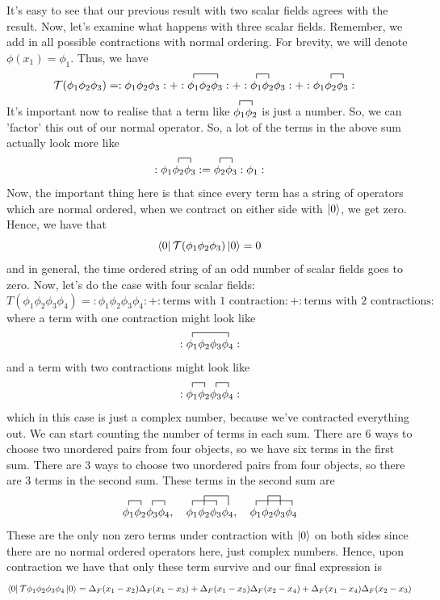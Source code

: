 \documentclass[11pt, oneside]{article}   	%
\theoremstyle{newline}
\theoremstyle{newline}
\theoremstyle{newline}
\theoremstyle{newline}
\theoremstyle{newline}
\begin{document}
It's easy to see that our previous result with two scalar fields agrees with the result. Now, let's examine what happens with three scalar fields. Remember, we add in all possible contractions with normal ordering. For brevity, we will denote $\phi(x_1) = \phi_1$. Thus, we have \begin{align*}  \mathcal{T}( \phi_1 \phi_2 \phi_3 ) &= :\phi_1 \phi_2 \phi_3:
+ :\contraction{}{\phi_1}{\phi_2}{\phi_3} \phi_1 \phi_2 \phi_3: + :\contraction{}{\phi_1}{}{\phi_2} \phi_1 \phi_2 \phi_3: + :\contraction{\phi_1}{\phi_2}{}{\phi_3} \phi_1 \phi_2 \phi_3 :  \end{align*} 
It's important now to realise that a term like $\contraction{}{\phi_1}{}{\phi_2} \phi_1 \phi_2$ is just a number. So, we can 'factor' this out of our normal operator. So, a lot of the terms in the above sum actually look more like \[ :\contraction{\phi_1} {\phi_2 }{}{\phi_3} \phi_1 \phi_2 \phi_3 : = \contraction{}{\phi_2}{}{\phi_3} \phi_2 \phi_3 :\phi_1: \] Now, the important thing here is that since every term has a string of operators which are normal ordered, when we contract on either side with $\ket{0}$, we get zero. Hence, we have that \[ \bra{0}\mathcal{T}(\phi_1 \phi_2 \phi_3)\ket{0} = 0 \] and in general, the time ordered string of an odd number of scalar fields goes to zero.  
Now, let's do the case with four scalar fields: 
\[ T(\phi_1 \phi_2 \phi_3 \phi_4 )  = :\phi_1 \phi_2 \phi_3 \phi_4:  + :\text{terms with 1 contraction}: + : \text{terms with 2 contractions} : \] 
where a term with one contraction might look like \[ :\contraction{}{\phi_1}{\phi_2 \phi_3} {\phi_4} \phi_1 \phi_2 \phi_3 \phi_4 : \] and a term with two contractions might look like\[ :\contraction{}{\phi_1}{}{\phi_2} \phi_1 \phi_2 \contraction{}{\phi_3}{}{\phi_4} \phi_3 \phi_4: \] which in this case is just a complex number, because we've contracted everything out. We can start counting the number of terms in each sum. There are 6 ways to choose two unordered pairs from four objects, so we have six terms in the first sum. There are 3 ways to choose two unordered pairs from four objects, so there are 3 terms in the second sum. 
These terms in the second sum are \[ \contraction{}{\phi_1}{}{\phi_2} \phi_1 \phi_2 \contraction{}{\phi_3}{}{\phi_4}\phi_3\phi_4, \quad \contraction{}{\phi_1}{\phi_2}{\phi_3} \contraction[2ex]{\phi_1}{\phi_2}{\phi_3}{\phi_4} \phi_1\phi_2 \phi_3 \phi_4, \quad \contraction{}{\phi_1}{\phi_2 \phi_3}{\phi_4} \contraction[2ex]{\phi_1}{\phi_2}{}{\phi_3} \phi_1\phi_2 \phi_3 \phi_4 \]
These are the only non zero terms under contraction with $\ket{0}$ on both sides since there are no normal ordered operators here, just complex numbers. Hence, upon contraction we have that only these term survive and our final expression is 
\[ \bra{0}\mathcal{T} \phi_1 \phi_ 2\phi_3 \phi_4 \ket{0} = \Delta_F(x_1 - x_2)\Delta_F(x_1 - x_3) + \Delta_F( x_1 - x_3 ) \Delta_F( x_2 - x_4 ) + \Delta_F( x_1 - x_4 )\Delta_F( x_2 - x_3) \]   
\end{document}
